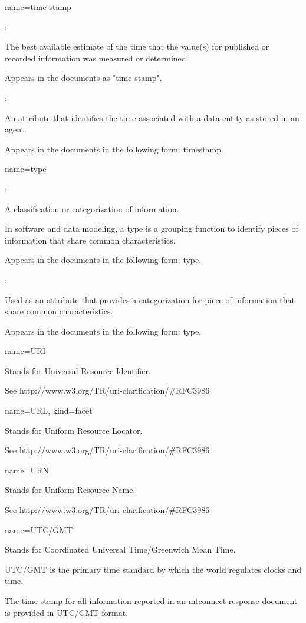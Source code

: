 {
  name={time stamp}
}
{
	:

	The best available estimate of the time that the value(s) for published or recorded information was measured or determined.

	Appears in the documents as "time stamp".

	:

	An attribute that identifies the time associated with a \gls{data entity} as stored in an \gls{agent}.

	Appears in the documents in the following form: \gls{timestamp}.
}


{
  name={type}
}
{
	:

	A classification or categorization of information.

	In software and data modeling, a type is a grouping function to identify pieces of information that share common characteristics. 

	Appears in the documents in the following form: type.

	:

	Used as an attribute that provides a categorization for piece of information that share common characteristics.

	Appears in the documents in the following form: \gls{type}.
}


{
  name={\normalfont URI}
}
{
	Stands for Universal Resource Identifier.  

	See http://www.w3.org/TR/uri-clarification/\#RFC3986  
}


{
  name={\normalfont URL},
  kind={facet}
}
{
	Stands for Uniform Resource Locator.  

	See http://www.w3.org/TR/uri-clarification/\#RFC3986
}


{
  name={\normalfont URN}
}
{
	Stands for Uniform Resource Name.  

	See http://www.w3.org/TR/uri-clarification/\#RFC3986  
}


{
  name={\normalfont UTC/GMT}
}
{
	Stands for Coordinated Universal Time/Greenwich Mean Time.  

	UTC/GMT is the primary time standard by which the world regulates clocks and time.

	The time stamp for all information reported in an \gls{mtconnect response document} is provided in UTC/GMT format.
}



